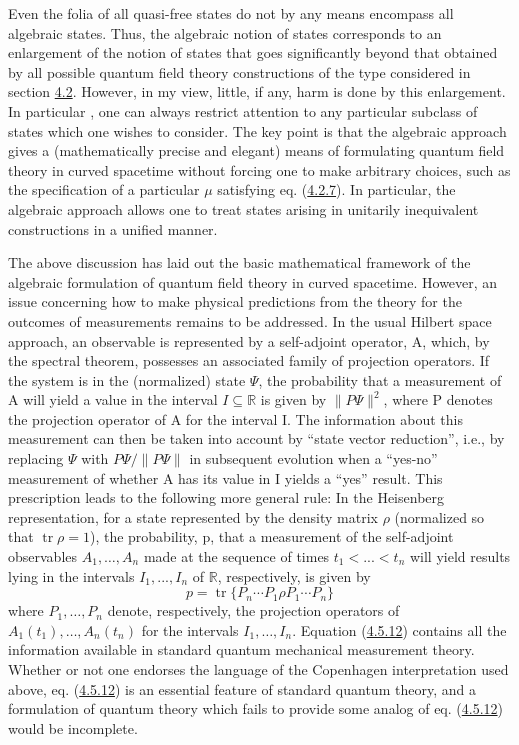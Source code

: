 \documentclass[11pt,a4paper]{article}
\begin{document}
Even the folia of all quasi-free states do not by any means encompass all algebraic states. Thus, the algebraic notion of states corresponds to an enlargement of the notion of states that goes significantly beyond that obtained by all possible quantum field theory constructions of the type considered in section \hyperlink{sec:4.2}{4.2}. However, in my view, little, if any, harm is done by this enlargement. In particular\hypertarget{source-91}{} , one can always restrict attention to any particular subclass of states which one wishes to consider. The key point is that the algebraic approach gives a (mathematically precise and elegant) means of formulating quantum field theory in curved spacetime without forcing one to make arbitrary choices, such as the specification of a particular \(\mu\) satisfying eq. (\hyperref[eq:4.2.7]{4.2.7}). In particular, the algebraic approach allows one to treat states arising in unitarily inequivalent constructions in a unified manner.

The above discussion has laid out the basic mathematical framework of the algebraic formulation of quantum field theory in curved spacetime. However, an issue concerning how to make physical predictions from the theory for the outcomes of measurements remains to be addressed. In the usual Hilbert space approach, an observable is represented by a self-adjoint operator, A, which, by the spectral theorem, possesses an associated family of projection operators. If the system is in the (normalized) state \(\Psi\), the probability that a measurement of A will yield a value in the interval \(I \subseteq \mathbb{R}\) is given by \(\lVert P\Psi\rVert^2\), where P denotes the projection operator of A for the interval I. The information about this measurement can then be taken into account by ``state vector reduction'', i.e., by replacing \(\Psi\) with \(P\Psi/\lVert P\Psi\rVert\) in subsequent evolution when a ``yes-no'' measurement of whether A has its value in I yields a ``yes'' result. This prescription leads to the following more general rule: In the Heisenberg representation, for a state represented by the density matrix \(\rho\) (normalized so that \(\operatorname{tr}\rho=1\)), the probability, p, that a measurement of the self-adjoint observables \(A_1,\ldots,A_n\) made at the sequence of times \(t_1 < ... < t_n\) will yield results lying in the intervals \(I_1, ..., I_n\) of \(\mathbb{R}\), respectively, is given by
\begin{equation*}
p = \operatorname{tr}\{P_n \cdots P_1 \rho P_1 \cdots P_n\} \tag{4.5.12}\label{eq:4.5.12}
\end{equation*}
where \(P_1,\ldots,P_n\) denote, respectively, the projection operators of \(A_1(t_1),\ldots,A_n(t_n)\) for the intervals \(I_1,\ldots,I_n\). Equation (\hyperref[eq:4.5.12]{4.5.12}) contains all the information available in standard quantum mechanical measurement theory. Whether or not one endorses the language of the Copenhagen interpretation used above, eq. (\hyperref[eq:4.5.12]{4.5.12}) is an essential feature of standard quantum theory, and a formulation of quantum theory which fails to provide some analog of eq. (\hyperref[eq:4.5.12]{4.5.12}) would be incomplete.
\end{document}
